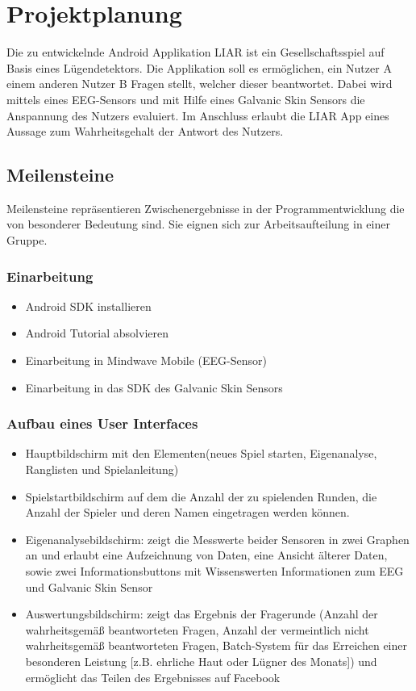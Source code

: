    	\newpage   	
   	\section{Projektplanung}
   	Die zu entwickelnde Android Applikation LIAR ist ein Gesellschaftsspiel auf Basis eines Lügendetektors. Die Applikation soll es ermöglichen, ein Nutzer A einem anderen Nutzer B Fragen stellt, welcher dieser beantwortet. Dabei wird mittels eines EEG-Sensors und mit Hilfe eines Galvanic Skin Sensors die Anspannung des Nutzers evaluiert. Im Anschluss erlaubt die LIAR App eines Aussage zum Wahrheitsgehalt der Antwort des Nutzers.
   	
   	\newpage
   	\subsection{Meilensteine}
	Meilensteine repräsentieren Zwischenergebnisse in der Programmentwicklung die von besonderer Bedeutung sind. Sie eignen sich zur Arbeitsaufteilung in einer Gruppe.
	\subsubsection{Einarbeitung}
	\begin{itemize}
	\item{}Android SDK installieren
	\item{}Android Tutorial absolvieren
	\item{}Einarbeitung in Mindwave Mobile (EEG-Sensor)
	\item{}Einarbeitung in das SDK des Galvanic Skin Sensors
	\end{itemize}	  	
	\subsubsection{Aufbau eines User Interfaces}
	\begin{itemize}
	\item{}Hauptbildschirm mit den Elementen(neues Spiel starten, Eigenanalyse, Ranglisten und Spielanleitung)
	\item{}Spielstartbildschirm auf dem die Anzahl der zu spielenden Runden, die Anzahl der Spieler und deren Namen eingetragen werden können.
	\item{}Eigenanalysebildschirm: zeigt die Messwerte beider Sensoren in zwei Graphen an und erlaubt eine Aufzeichnung von Daten, eine Ansicht älterer Daten, sowie zwei Informationsbuttons mit Wissenswerten Informationen zum EEG und Galvanic Skin Sensor
	\item{}Auswertungsbildschirm: zeigt das Ergebnis der Fragerunde (Anzahl der wahrheitsgemäß beantworteten Fragen, Anzahl der vermeintlich nicht wahrheitsgemäß beantworteten Fragen, Batch-System für das Erreichen einer besonderen Leistung [z.B. ehrliche Haut oder Lügner des Monats]) und ermöglicht das Teilen des Ergebnisses auf Facebook
	\end{itemize}
